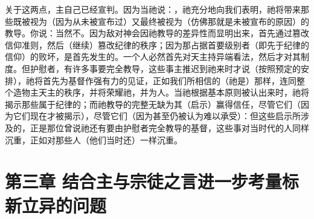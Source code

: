 关于这两点，主自己已经宣判。因为当祂说：，祂充分地向我们表明，祂将带来那些既被视为（因为从未被宣布过）又最终被视为（仿佛那就是未被宣布的原因）的教导。你说：当然不。因为敌对神会因祂教导的差异性而显明出来，首先通过篡改信仰准则，然后（继续）篡改纪律的秩序；因为那占据首要级别者（即先于纪律的信仰）的败坏，是首先发生的。一个人必然首先对天主持异端看法，然后才对其制度。但护慰者，有许多事要完全教导，这些事主推迟到祂来时才说（按照预定的安排），祂将首先为基督作强有力的见证，正如我们所相信的（祂是）那样，连同整个造物主天主的秩序，并将荣耀祂，并为人。当祂根据基本原则被认出来时，祂将揭示那些属于纪律的；而祂教导的完整无缺为其（启示）赢得信任，尽管它们（因为它们现在才被揭示），尽管它们（因为甚至仍被认为难以承受）：但这些启示所涉及的，正是那位曾说祂还有要由护慰者完全教导的基督，这些事对当时代的人同样沉重，正如对那些人（他们当时还）一样沉重。\par


\section{第三章 结合主与宗徒之言进一步考量标新立异的问题}

